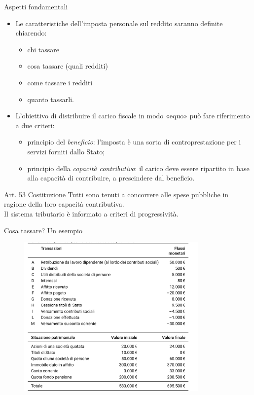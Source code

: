 \documentclass[aspectratio=64,12pt]{beamer}
\newcommand\€{\,\text{€}}
\begin{document}
\begin{frame}{Aspetti fondamentali}
\begin{itemize}
\item Le caratteristiche dell'imposta personale sul reddito saranno definite chiarendo:
\begin{itemize}
\item chi tassare
\item cosa tassare (quali redditi)
\item come tassare i redditi
\item quanto tassarli.
\end{itemize}
\item L'obiettivo di distribuire il carico fiscale in modo «equo» può fare riferimento a due criteri:
\begin{itemize}
\item principio del \emph{beneficio}: l'imposta è una sorta di controprestazione per i servizi forniti dallo Stato;
\item principio della \emph{capacità contributiva}: il carico deve essere ripartito in base alla capacità di contribuire, a prescindere dal beneficio.
\end{itemize}
\end{itemize}
\begin{block}{Art. 53 Costituzione}
Tutti  sono  tenuti  a  concorrere  alle spese pubbliche in ragione della loro capacità contributiva.\\[0pt]
Il sistema tributario è informato a criteri di progressività.
\end{block}
\end{frame}

\begin{frame}{Cosa tassare? Un esempio}
\begin{figure}
\centering
\includegraphics[height=8cm]{./figure/esempio-reddito-patrimonio.png}
\end{figure}
\end{frame}
\end{document}
